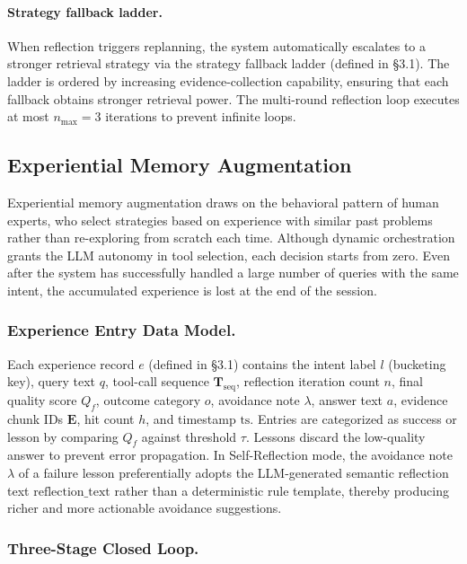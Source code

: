 \documentclass[runningheads]{llncs}
\begin{document}
\paragraph{Strategy fallback ladder.}
When reflection triggers replanning, the system automatically escalates to a stronger retrieval strategy via the strategy fallback ladder (defined in \S3.1). The ladder is ordered by increasing evidence-collection capability, ensuring that each fallback obtains stronger retrieval power. The multi-round reflection loop executes at most $n_{\max} = 3$ iterations to prevent infinite loops.

\subsection{Experiential Memory Augmentation}

Experiential memory augmentation draws on the behavioral pattern of human experts, who select strategies based on experience with similar past problems rather than re-exploring from scratch each time. Although dynamic orchestration grants the LLM autonomy in tool selection, each decision starts from zero. Even after the system has successfully handled a large number of queries with the same intent, the accumulated experience is lost at the end of the session.

\subsubsection{Experience Entry Data Model.}

Each experience record $e$ (defined in \S3.1) contains the intent label $l$ (bucketing key), query text $q$, tool-call sequence $\mathbf{T}_{\text{seq}}$, reflection iteration count $n$, final quality score $Q_f$, outcome category $o$, avoidance note $\lambda$, answer text $a$, evidence chunk IDs $\mathbf{E}$, hit count $h$, and timestamp $\text{ts}$. Entries are categorized as success or lesson by comparing $Q_f$ against threshold $\tau$. Lessons discard the low-quality answer to prevent error propagation. In Self-Reflection mode, the avoidance note $\lambda$ of a failure lesson preferentially adopts the LLM-generated semantic reflection text $\text{reflection\_text}$ rather than a deterministic rule template, thereby producing richer and more actionable avoidance suggestions.

\subsubsection{Three-Stage Closed Loop.}
\end{document}
